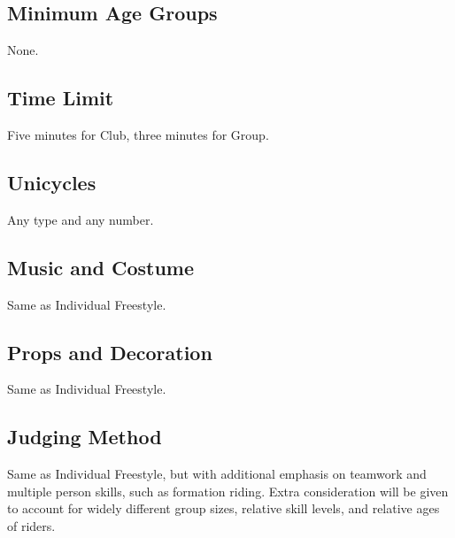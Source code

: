 \subsection{Minimum Age Groups}
None.

\subsection{Time Limit}
Five minutes for Club, three minutes for Group.

\subsection{Unicycles}
Any type and any number.

\subsection{Music and Costume}
Same as Individual Freestyle.

\subsection{Props and Decoration}
Same as Individual Freestyle.

\subsection{Judging Method}
Same as Individual Freestyle, but with additional emphasis on teamwork and multiple person skills, such as formation riding.
Extra consideration will be given to account for widely different group sizes, relative skill levels, and relative ages of riders.
